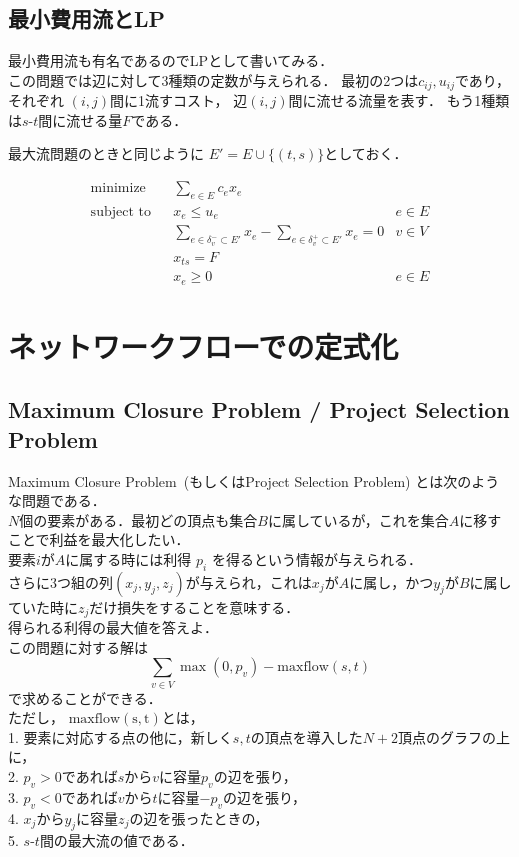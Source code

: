 \documentclass[13pt, a4paper, landscape]{jarticle}
\theoremstyle{nonitalic} %
\begin{document}
\subsection{最小費用流とLP}

最小費用流も有名であるのでLPとして書いてみる． \\
この問題では辺に対して3種類の定数が与えられる． 最初の2つは$c_{ij}, u_{ij}$であり，それぞれ $(i,j)$間に1流すコスト， 辺$(i,j)$間に流せる流量を表す． 
もう1種類は$s$-$t$間に流せる量$F$である．

最大流問題のときと同じように $E' = E \cup \{ (t,s) \} $としておく．

\begin{align}
 &&&&&\textrm{minimize}   && \sum_{e\in E} c_e x_e  \\
 &&&&&\textrm{subject to} && x_{e} \leq u_e & e  \in E \\
 &&&&&                    && \sum_{e \in \delta_v^-  \subset E'} x_e - \sum_{e \in \delta_v^+  \subset E'} x_e= 0 & v \in V  &&&&& \\
 &&&&&                    && x_{ts} = F \\
 &&&&&                    && x_e \geq 0 & e \in E &&&&&
\end{align}



\section{ネットワークフローでの定式化}
\subsection{Maximum Closure Problem / Project Selection Problem}
Maximum Closure Problem~(もしくはProject Selection Problem) とは次のような問題である．\\

$N$個の要素がある．最初どの頂点も集合$B$に属しているが，これを集合$A$に移すことで利益を最大化したい． \\
要素$i$が$A$に属する時には利得 $p_i$ を得るという情報が与えられる． \\
さらに3つ組の列$(x_j, y_j, z_j)$が与えられ，これは$x_j$が$A$に属し，かつ$y_j$が$B$に属していた時に$z_j$だけ損失をすることを意味する． \\
得られる利得の最大値を答えよ． \\


この問題に対する解は
\[ \sum_{v \in V } \max(0,p_v) - \mathrm{maxflow}(s,t) \]
で求めることができる．\\
ただし， $\mathrm{maxflow(s,t)}$とは，\\
1. 要素に対応する点の他に，新しく$s,t$の頂点を導入した$N+2$頂点のグラフの上に，\\
2. $p_v>0$であれば$s$から$v$に容量$p_v$の辺を張り，\\
3. $p_v<0$であれば$v$から$t$に容量$-p_v$の辺を張り，\\
4. $x_j$から$y_j$に容量$z_j$の辺を張ったときの，\\
5. $s$-$t$間の最大流の値である．
\end{document}

